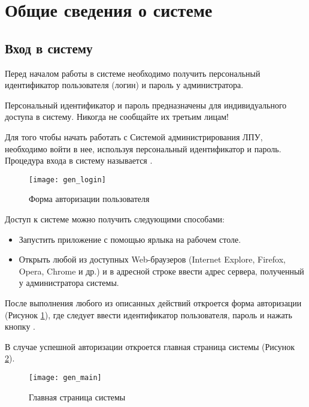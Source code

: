 \newpage
\section{Общие сведения о системе}

\subsection{Вход в систему}

Перед началом работы в системе необходимо получить персональный идентификатор пользователя (логин) и пароль у администратора.

\begin{vnim}
 Персональный идентификатор и пароль предназначены для индивидуального доступа в систему. Никогда не сообщайте их третьим лицам!
\end{vnim}
 
Для того чтобы начать работать с Системой администрирования ЛПУ, необходимо войти в нее, используя персональный идентификатор и пароль. Процедура входа в систему называется . \label{auth}

\begin{figure}[ht]\centering
 \texttt{[image: gen\_login]}
 \caption{Форма авторизации пользователя}
 \label{img_gen_login}
\end{figure} 

Доступ к системе можно получить следующими способами:
\begin{itemize}
 \item Запустить приложение с помощью ярлыка на рабочем столе.
 \item Открыть любой из доступных Web-браузеров (Internet Explore, Firefox, Opera, Chrome и др.) и в адресной строке ввести адрес сервера, полученный у администратора системы.
\end{itemize}

После выполнения любого из описанных действий откроется форма авторизации (Рисунок \ref{img_gen_login}), где следует ввести идентификатор пользователя, пароль и нажать кнопку .

В случае успешной авторизации откроется главная страница системы (Рисунок \ref{img_gen_main}).

\begin{figure}[ht]\centering
 \texttt{[image: gen\_main]}
 \caption{Главная страница системы}
 \label{img_gen_main}
\end{figure} 

